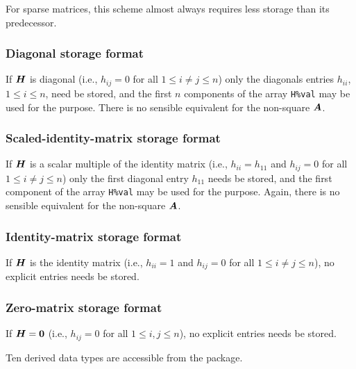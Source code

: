 \documentclass{galahad}
\begin{document}
For sparse matrices, this scheme almost always requires less storage than
its predecessor.

\subsubsection{Diagonal storage format}\label{diagonal}
If ${\bm{H}}$ is diagonal (i.e., $h_{ij} = 0$ for all $1 \leq i \neq j \leq n$)
only the diagonals entries $h_{ii}$, $1 \leq i \leq n$,  need be stored,
and the first $n$ components of the array {\tt H\%val} may be used for
the purpose. There is no sensible equivalent for the non-square ${\bm{A}}$.

\subsubsection{Scaled-identity-matrix storage format}\label{scaled-identity}
If ${\bm{H}}$ is a scalar multiple of the identity matrix
(i.e., $h_{ii} = h_{11}$  and $h_{ij} = 0$ for all $1 \leq i \neq j \leq n$)
only the first diagonal entry $h_{11}$ needs be stored,
and the first component of the array {\tt H\%val} may be used for
the purpose. Again, there is no sensible equivalent for the non-square ${\bm{A}}$.

\subsubsection{Identity-matrix storage format}\label{identity}
If ${\bm{H}}$ is the identity matrix
(i.e., $h_{ii} = 1$ and $h_{ij} = 0$ for all $1 \leq i \neq j \leq n$),
no explicit entries needs be stored.

\subsubsection{Zero-matrix storage format}\label{zero}
If ${\bm{H}} = {\bm{0}}$ (i.e., $h_{ij} = 0$ for all $1 \leq i, j \leq n$),
no explicit entries needs be stored.








\galtypes
Ten derived data types are accessible from the package.

\end{document}
